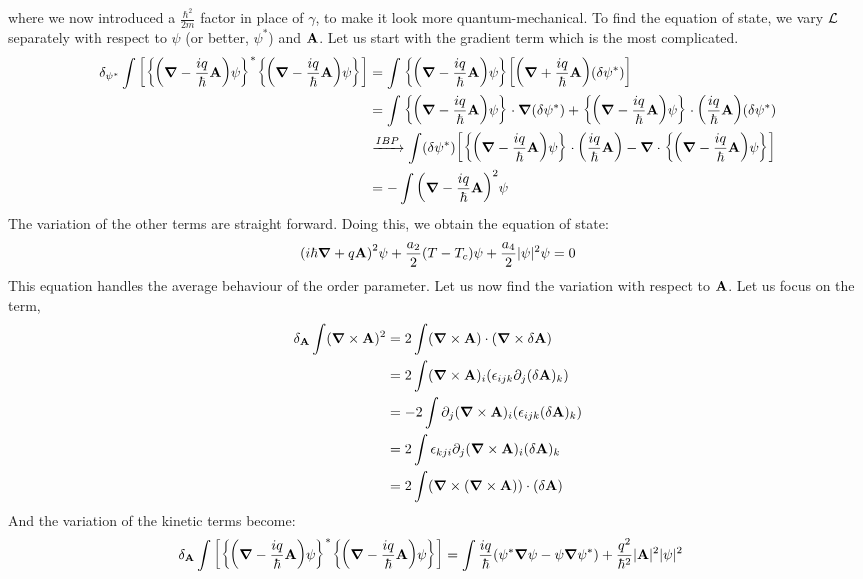 where we now introduced a $\frac{\hbar^2}{2m}$ factor in place of $\gamma$, to make it look more quantum-mechanical. To find the equation of state, we vary $\mathcal L$ separately with respect to $\psi$ (or better, $\psi^*$) and $\vb{A}$. Let us start with the gradient term which is the most complicated.
\begin{align*}
    \delta_{\psi^*}\int \qty[\qty{\qty(\grad - \frac{iq}{\hbar}\vb{A})\psi}^*\qty{\qty(\grad - \frac{iq}{\hbar}\vb{A})\psi}]&=\int\qty{\qty(\grad - \frac{iq}{\hbar}\vb{A})\psi} \qty[\qty(\grad + \frac{iq}{\hbar}\vb{A})(\delta\psi^*)] \\
    &=\int\qty{\qty(\grad - \frac{iq}{\hbar}\vb{A})\psi} \cdot \grad (\delta\psi^*) +\qty{\qty(\grad - \frac{iq}{\hbar}\vb{A})\psi}\cdot\qty(\frac{iq}{\hbar}\vb{A})(\delta\psi^*)\\
    &\xrightarrow{IBP} \int (\delta \psi^*)\qty[\qty{\qty(\grad - \frac{iq}{\hbar}\vb{A})\psi}\cdot\qty(\frac{iq}{\hbar}\vb{A}) -\grad \cdot\qty{\qty(\grad - \frac{iq}{\hbar}\vb{A})\psi}]\\
    &=-\int\qty(\grad - \frac{iq}{\hbar}\vb{A})^2\psi 
\end{align*}
The variation of the other terms are straight forward. Doing this, we obtain the equation of state:
\begin{equation}
   \qty(i\hbar \grad + q\vb{A})^2\psi +\frac{a_2}{2}(T-T_c)\psi + \frac{a_4}{2}|\psi|^2 \psi =0
\end{equation}
This equation handles the average behaviour of the order parameter. Let us now find the variation with respect to $\vb{A}$. Let us focus on the term,
\begin{align*}
    \delta_{\vb{A}}\int (\grad\times \vb{A})^2 &= 2\int (\grad\times \vb{A})\cdot(\grad\times \delta \vb{A})\\
    &=2\int (\grad\times \vb{A})_i(\epsilon_{ijk}\partial_j (\delta \vb{A})_k)\\
    &=-2\int \partial_j(\grad\times \vb{A})_i(\epsilon_{ijk} (\delta \vb{A})_k)\\
    &=2\int \epsilon_{kji}\partial_j (\grad\times \vb{A})_i (\delta \vb{A})_k \\
    &=2\int (\grad\times (\grad\times \vb{A}))\cdot (\delta \vb{A})
\end{align*}
And the variation of the kinetic terms become:
\begin{align*}
    \delta_{\vb{A}}\int \qty[\qty{\qty(\grad - \frac{iq}{\hbar}\vb{A})\psi}^*\qty{\qty(\grad - \frac{iq}{\hbar}\vb{A})\psi}]&= \int \frac{iq}{\hbar}\qty(\psi^* \grad\psi -\psi \grad \psi^*) + \frac{q^2}{\hbar^2}|\vb{A}|^2 |\psi|^2
\end{align*}
